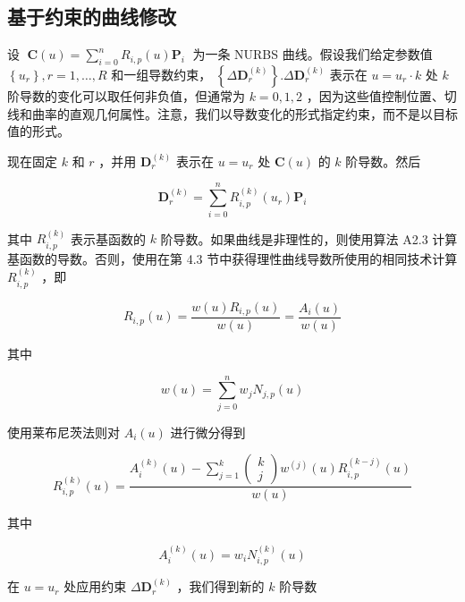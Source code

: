 \documentclass[../main.tex]{subfiles}
\begin{document}
\subsection{基于约束的曲线修改}
设 \(\;\mathbf{C}\left( u\right)  = \mathop{\sum }\limits_{{i = 0}}^{n}{R}_{i,p}\left( u\right) {\mathbf{P}}_{i}\;\) 为一条 NURBS 曲线。假设我们给定参数值 \(\left\{  {u}_{r}\right\}  ,r = 1,\ldots ,R\) 和一组导数约束， \(\left\{  {\Delta {\mathbf{D}}_{r}^{\left( k\right) }}\right\}  .\Delta {\mathbf{D}}_{r}^{\left( k\right) }\) 表示在 \(u = {u}_{r} \cdot  k\) 处 \(k\) 阶导数的变化可以取任何非负值，但通常为 \(k = 0,1,2\) ，因为这些值控制位置、切线和曲率的直观几何属性。注意，我们以导数变化的形式指定约束，而不是以目标值的形式。

现在固定 \(k\) 和 \(r\) ，并用 \({\mathbf{D}}_{r}^{\left( k\right) }\) 表示在 \(u = {u}_{r}\) 处 \(\mathbf{C}\left( u\right)\) 的 \(k\) 阶导数。然后

\[
{\mathbf{D}}_{r}^{\left( k\right) } = \mathop{\sum }\limits_{{i = 0}}^{n}{R}_{i,p}^{\left( k\right) }\left( {u}_{r}\right) {\mathbf{P}}_{i} \tag{11.65}
\]

其中 \({R}_{i,p}^{\left( k\right) }\) 表示基函数的 \(k\) 阶导数。如果曲线是非理性的，则使用算法 A2.3 计算基函数的导数。否则，使用在第 4.3 节中获得理性曲线导数所使用的相同技术计算 \({R}_{i,p}^{\left( k\right) }\) ，即

\[
{R}_{i,p}\left( u\right)  = \frac{w\left( u\right) {R}_{i,p}\left( u\right) }{w\left( u\right) } = \frac{{A}_{i}\left( u\right) }{w\left( u\right) }
\]

其中

\[
w\left( u\right)  = \mathop{\sum }\limits_{{j = 0}}^{n}{w}_{j}{N}_{j,p}\left( u\right)
\]

使用莱布尼茨法则对 \({A}_{i}\left( u\right)\) 进行微分得到

\[
{R}_{i,p}^{\left( k\right) }\left( u\right)  = \frac{{A}_{i}^{\left( k\right) }\left( u\right)  - \mathop{\sum }\limits_{{j = 1}}^{k}\left( \begin{array}{l} k \\  j \end{array}\right) {w}^{\left( j\right) }\left( u\right) {R}_{i,p}^{\left( k - j\right) }\left( u\right) }{w\left( u\right) } \tag{11.66}
\]

其中

\[
{A}_{i}^{\left( k\right) }\left( u\right)  = {w}_{i}{N}_{i,p}^{\left( k\right) }\left( u\right)
\]

在 \(u = {u}_{r}\) 处应用约束 \(\Delta {\mathbf{D}}_{r}^{\left( k\right) }\) ，我们得到新的 \(k\) 阶导数
\end{document}
